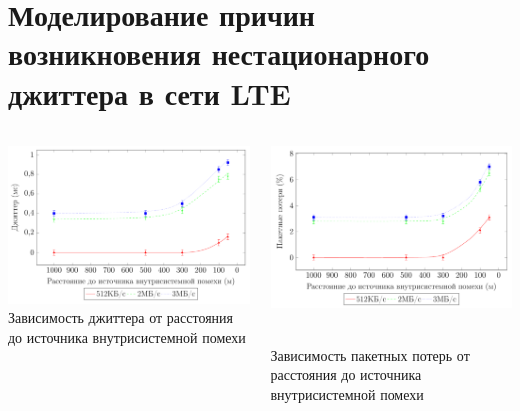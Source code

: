 \documentclass[10pt,pdf,hyperref={unicode}]{beamer}
\begin{document}
\section{Моделирование причин возникновения нестационарного джиттера в сети LTE}

\begin{frame}
\begin{columns}[T]
\begin{column}{0.5\textwidth}

\includegraphics[width=1\linewidth]{intervsSdj.png}
{\scriptsize \\Зависимость джиттера от расстояния до источника внутрисистемной помехи}

\end{column}

\begin{column}{0.5\textwidth}

\includegraphics[width=1\linewidth]{intervsSdr.png}

{\scriptsize \\Зависимость пакетных потерь от расстояния до источника внутрисистемной помехи}

\end{column}
\end{columns}
\end{frame}
\end{document}
